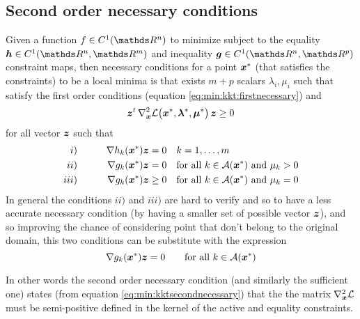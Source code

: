 \subsection{Second order necessary conditions} 
	Given a function $f \in C^1(\R^n)$ to minimize subject to the equality $\vett h\in C^1(\R^n,\R^m)$ and inequality $\vett g \in C^1(\R^n,\R^p)$ constraint maps, then necessary conditions for a point $\boldsymbol{x}^*$ (that satisfies the constraints) to be a local minima is that exists $m+p$ scalars $\lambda_i,\mu_i$ such that satisfy the first order conditions (equation \ref{eq:min:kkt:firstnecessary}) and
	\begin{equation} \label{eq:min:kktsecondnecessary}
		\boldsymbol{z}^t \, \nabla^2_{\boldsymbol{x}} \mathcal L\big(\boldsymbol{x}^*,\boldsymbol{\lambda}^*,\boldsymbol{\mu}^*\big) \, \boldsymbol{z} \geq 0
	\end{equation}	
	for all vector $\boldsymbol{z}$ such that
	\begin{align*}
		i) \qquad && \nabla h_k(\boldsymbol{x}^*) \boldsymbol{z} & = 0 && k = 1,\dots,m \\
		ii) \qquad &&\nabla g_k(\boldsymbol{x}^*) \boldsymbol{z} & = 0 && \textrm{for all } k\in \mathcal A(\boldsymbol{x}^*) \textrm{ and } \mu_k > 0 \\
		iii) \qquad &&\nabla g_k(\boldsymbol{x}^*) \boldsymbol{z} & \geq 0 && \textrm{for all } k\in \mathcal A(\boldsymbol{x}^*) \textrm{ and } \mu_k = 0
	\end{align*}
	In general the conditions $ii)$ and $iii)$ are hard to verify and so to have a less accurate necessary condition (by having a smaller set of possible vector $\boldsymbol{z}$), and so improving the chance of considering point that don't belong to the original domain, this two conditions can be substitute with the expression
	\[ \nabla g_k(\boldsymbol{x}^*) \boldsymbol{z} = 0 \qquad \textrm{for all } k \in \mathcal A(\boldsymbol{x}^*) \]
	
	\vspace{3mm}
	In other words the second order necessary condition (and similarly the sufficient one) states (from equation \ref{eq:min:kktsecondnecessary}) that the the matrix $\nabla^2_{\boldsymbol{x}} \mathcal L$ must be semi-positive defined in the kernel of the active and equality constraints.
	
